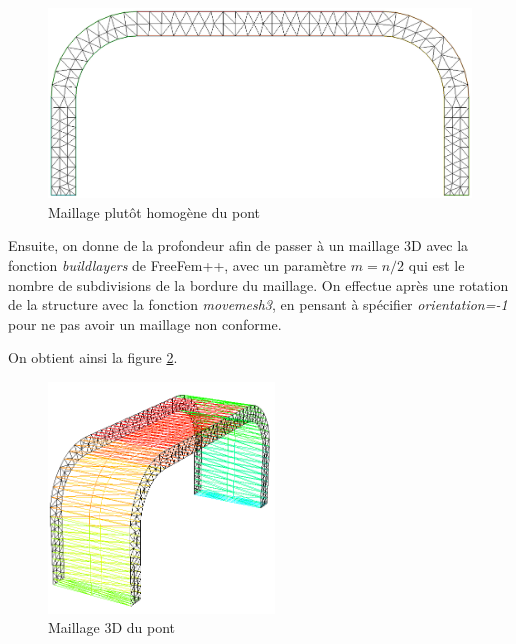     \begin{figure}     
        \begin{center}
        
            \includegraphics[width=12cm]{imgs/all_maillage_pondere.PNG}
            \caption{Maillage plutôt homogène du pont}
            \label{fig:maillage_pondere}
        
        \end{center}
    \end{figure}

    Ensuite, on donne de la profondeur afin de passer à un maillage 3D avec la fonction \emph{buildlayers} de FreeFem++, 
    avec un paramètre $m=n/2$ qui est le nombre de subdivisions de la bordure du maillage. On effectue après une rotation de la structure 
    avec la fonction \emph{movemesh3}, en pensant à spécifier \emph{orientation=-1} pour ne pas avoir un maillage non conforme.

    On obtient ainsi la figure \ref{fig:maillage_3d}.

    
    \begin{figure}        
        \begin{center}
        
            \includegraphics[width=6cm]{imgs/all_maillage_3d.PNG}
            \caption{Maillage 3D du pont}
            \label{fig:maillage_3d}
        
        \end{center}
    \end{figure}

